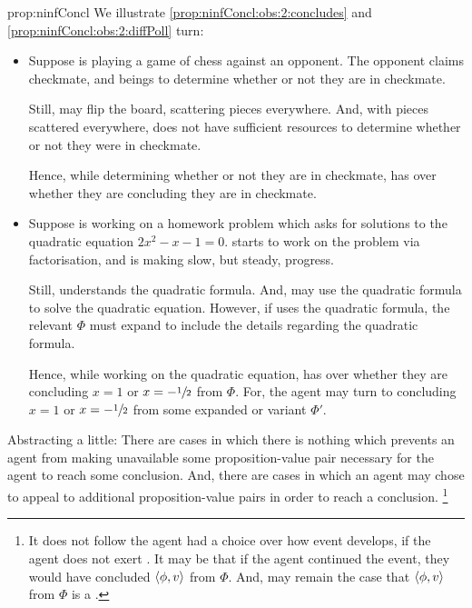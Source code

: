 \begin{note}
\begin{argument}{prop:ninfConcl}
    \noindent%
    We illustrate \ref{prop:ninfConcl:obs:2:concludes} and \ref{prop:ninfConcl:obs:2:diffPoll} turn:

    \begin{itemize}
    \item
      Suppose \vAgent{} is playing a game of chess against an opponent.
      The opponent claims checkmate, and \vAgent{} beings to determine whether or not they are in checkmate.

      Still, \vAgent{} may flip the board, scattering pieces everywhere.
      And, with pieces scattered everywhere, \vAgent{} does not have sufficient resources to determine whether or not they were in checkmate.

      Hence, while determining whether or not they are in checkmate, \vAgent{} has \ninf{} over whether they are concluding they are in checkmate.
    \end{itemize}

    \begin{itemize}
    \item
      Suppose \vAgent{} is working on a homework problem which asks for solutions to the quadratic equation \(2x^{2} - x - 1 = 0\).
      \vAgent{} starts to work on the problem via factorisation, and is making slow, but steady, progress.

      Still, \vAgent{} understands the quadratic formula.
      And, \vAgent{} may use the quadratic formula to solve the quadratic equation.
      However, if \vAgent{} uses the quadratic formula, the relevant \pool{} \(\Phi\) must expand to include the details regarding the quadratic formula.

      Hence, while working on the quadratic equation, \vAgent{} has \ninf{} over whether they are concluding \(x = 1\) or \(x = -\sfrac{1}{2}\) from \(\Phi\).
      For, the agent may turn to concluding \(x = 1\) or \(x = -\sfrac{1}{2}\) from some expanded or variant \pool{} \(\Phi'\).
    \end{itemize}
    Abstracting a little:
    There are cases in which there is nothing which prevents an agent from making unavailable some proposition-value pair necessary for the agent to reach some conclusion.
    And, there are cases in which an agent may chose to appeal to additional proposition-value pairs in order to reach a conclusion.%
    \footnote{
      It does not follow the agent had a choice over how event develops, if the agent does not exert \ninf{}.
      It may be that if the agent continued the event, they would have concluded \(\langle \phi, v \rangle\) from \(\Phi\).
      And, may remain the case that \(\langle \phi, v \rangle\) from \(\Phi\) is a \fc{}.
    }
  \end{argument}
\end{note}

